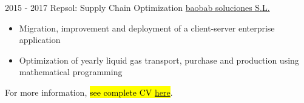 \documentclass[letterpaper]{twentysecondcv} %
\begin{document}
\begin{twenty}
  \twentyitem
      {2015 - 2017 }
    {}
        {Repsol: Supply Chain Optimization}
        {\href{https://baobabsoluciones.es/en/}{baobab soluciones S.L.}}
        {}
        {
        {\begin{itemize}
        \item Migration, improvement and deployment of a client-server enterprise application
        \item Optimization of yearly liquid gas transport, purchase and production using mathematical programming
        \vspace{2mm}
        \end{itemize}}
        }
\end{twenty}

For more information, \hl{see complete CV \hbox{\href{https://europa.eu/europass/eportfolio/screen/share/34c12681-45d1-4f40-a880-087989e3c3b6?lang=en}{here}}}.
\end{document}
